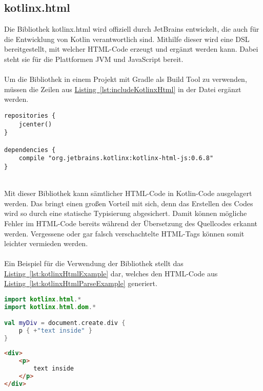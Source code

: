 \subsection{kotlinx.html}\label{sec:kotlinxHtml}
Die Bibliothek kotlinx.html \cite{kotlinxHtml} wird offiziell durch JetBrains entwickelt, die auch für die Entwicklung von Kotlin verantwortlich sind. Mithilfe dieser wird eine \gls{DSL} bereitgestellt, mit welcher \gls{HTML}-Code erzeugt und ergänzt werden kann. Dabei steht sie für die Plattformen \gls{JVM} und JavaScript bereit.\\
\\
Um die Bibliothek in einem Projekt mit Gradle als Build Tool zu verwenden, müssen die Zeilen aus \hyperref[lst:includeKotlinxHtml]{Listing~\ref{lst:includeKotlinxHtml}} in der Datei  ergänzt werden.
\\
\begin{lstlisting}[style=lstStyleFramed, language=Gradle, caption={Einbindung der Bibliothek kotlinx.html mittels Gradle}, label=lst:includeKotlinxHtml, float]
repositories {
	jcenter()
}

dependencies {
	compile "org.jetbrains.kotlinx:kotlinx-html-js:0.6.8"
}
\end{lstlisting}
\\
Mit dieser Bibliothek kann sämtlicher \gls{HTML}-Code in Kotlin-Code ausgelagert werden. Das bringt einen großen Vorteil mit sich, denn das Erstellen des Codes wird so durch eine statische Typisierung abgesichert. Damit können mögliche Fehler im \gls{HTML}-Code bereits während der Übersetzung des Quellcodes erkannt werden. Vergessene oder gar falsch verschachtelte \gls{HTML}-Tags können somit leichter vermieden werden.\\
\\
Ein Beispiel für die Verwendung der Bibliothek stellt das \hyperref[lst:kotlinxHtmlExample]{Listing~\ref{lst:kotlinxHtmlExample}} dar, welches den \gls{HTML}-Code aus \hyperref[lst:kotlinxHtmlParseExample]{Listing~\ref{lst:kotlinxHtmlParseExample}} generiert.
\\
\begin{lstlisting}[style=lstStyleFramed, language=Kotlin, caption={Beispiel: Verwendung der Bibliothek kotlinx.html \cite{kotlinxHtmlExample}}, label=lst:kotlinxHtmlExample, float]
import kotlinx.html.*
import kotlinx.html.dom.*

val myDiv = document.create.div {
	p { +"text inside" }
}
\end{lstlisting}
\begin{lstlisting}[style=lstStyleFramed, language=html, caption={Beispiel: Verwendung der Bibliothek kotlinx.html (Ergebnis)}, label=lst:kotlinxHtmlParseExample, float]
<div>
	<p>
		text inside
	</p>
</div>
\end{lstlisting}


